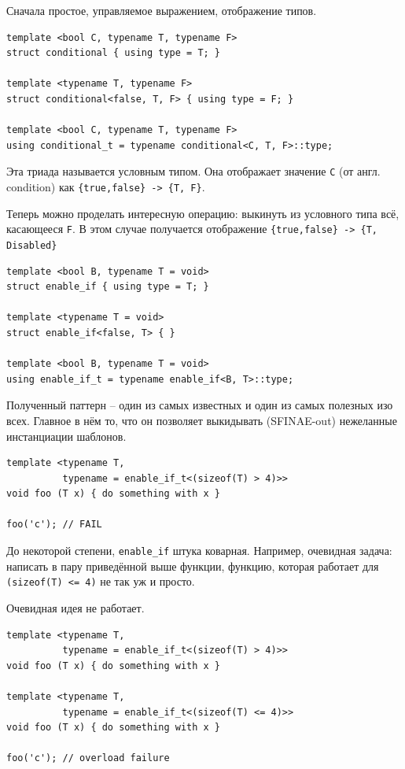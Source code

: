 \documentclass[a4paper,12pt,oneside]{book}
\begin{document}
Сначала простое, управляемое выражением, отображение типов.

\begin{lstlisting}
template <bool C, typename T, typename F> 
struct conditional { using type = T; }

template <typename T, typename F> 
struct conditional<false, T, F> { using type = F; }

template <bool C, typename T, typename F> 
using conditional_t = typename conditional<C, T, F>::type;
\end{lstlisting}

Эта триада называется условным типом. Она отображает значение \lstinline!C! (от англ. condition) как \lstinline!{true,false} -> {T, F}!.

Теперь можно проделать интересную операцию: выкинуть из условного типа всё, касающееся \lstinline!F!. В этом случае получается отображение \lstinline!{true,false} -> {T, Disabled}!

\begin{lstlisting}
template <bool B, typename T = void> 
struct enable_if { using type = T; }

template <typename T = void> 
struct enable_if<false, T> { }

template <bool B, typename T = void> 
using enable_if_t = typename enable_if<B, T>::type;
\end{lstlisting}

Полученный паттерн -- один из самых известных и один из самых полезных изо всех. Главное в нём то, что он позволяет выкидывать (SFINAE-out) нежеланные инстанциации шаблонов.

\begin{lstlisting}
template <typename T, 
          typename = enable_if_t<(sizeof(T) > 4)>>
void foo (T x) { do something with x }

foo('c'); // FAIL
\end{lstlisting}

До некоторой степени, \lstinline!enable_if! штука коварная. Например, очевидная задача: написать в пару приведённой выше функции, функцию, которая работает для \lstinline!(sizeof(T) <= 4)! не так уж и просто.

Очевидная идея не работает.

\begin{lstlisting}
template <typename T, 
          typename = enable_if_t<(sizeof(T) > 4)>>
void foo (T x) { do something with x }

template <typename T, 
          typename = enable_if_t<(sizeof(T) <= 4)>>
void foo (T x) { do something with x }

foo('c'); // overload failure
\end{lstlisting}
\end{document}
